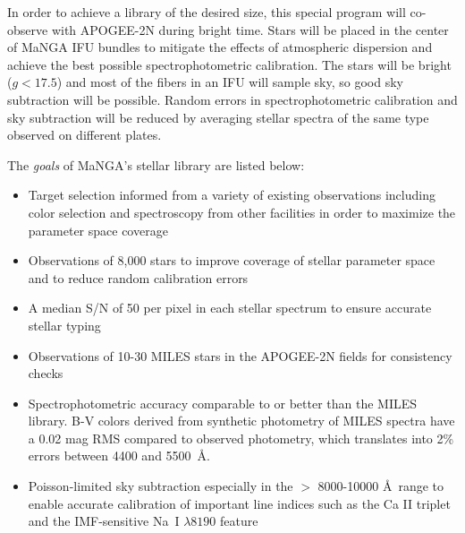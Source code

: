\documentclass[preprint,11pt]{aastex}
\begin{document}

In order to achieve a library of the desired size, this special program will 
co-observe with APOGEE-2N during bright time.  Stars will be placed
in the center of MaNGA IFU bundles to mitigate the effects of atmospheric
dispersion and achieve the best possible spectrophotometric calibration.
The stars will be bright ($g < 17.5$) and most of the fibers in an IFU 
will sample sky, so good sky subtraction will be possible. Random errors 
in spectrophotometric calibration and sky subtraction will be reduced by 
averaging stellar spectra of the same type observed on different plates.

\noindent The {\em goals} of MaNGA's stellar library are listed below:
\begin{itemize}

\item Target selection informed from a variety of existing observations including color selection and spectroscopy from other
  facilities in order to maximize the parameter space coverage

\item Observations of 8,000 stars to improve coverage of stellar 
parameter space and to reduce random calibration errors

\item A median S/N of 50 per pixel in each stellar spectrum to ensure  
accurate stellar typing

\item Observations of 10-30 MILES stars in the APOGEE-2N fields for 
consistency checks

\item Spectrophotometric accuracy comparable to or better than the 
MILES library.  B-V colors derived from synthetic photometry of MILES spectra 
have a 0.02 mag RMS compared to observed photometry, which translates
into 2\% errors between 4400 and 5500~\AA.   

\item Poisson-limited sky subtraction especially in the $>$ 8000-10000 \AA\
 range to enable accurate calibration of important line indices such
 as the Ca II triplet and the IMF-sensitive Na~I $\lambda8190$ feature

\end{itemize}
\end{document}
